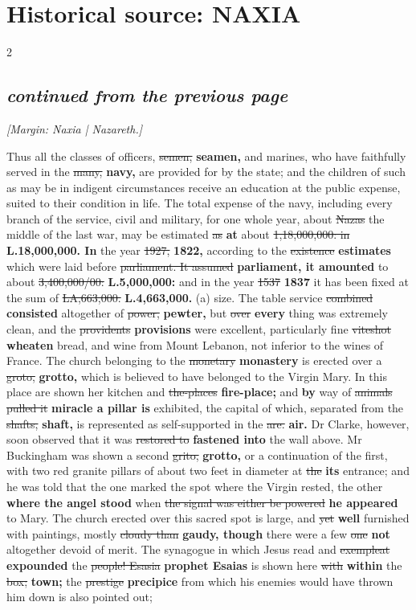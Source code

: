 \documentclass[10pt]{article}
\begin{document}
\section*{Historical source: NAXIA}
\begin{multicols}{2}
\subsection*{\textit{continued from the previous page}}
{\small\itshape [Margin: Naxia | Nazareth.]}\par
Thus all the classes of officers, \sout{semen,} \textbf{seamen,} and marines, who have faithfully served in the \sout{many,} \textbf{navy,} are provided for by the state; and the children of such as may be in indigent circumstances receive an education at the public expense, suited to their condition in life. The total expense of the navy, including every branch of the service, civil and military, for one whole year, about \sout{Nazas} the middle of the last war, may be estimated \sout{as} \textbf{at} about \sout{1,18,000,000: in} \textbf{L.18,000,000. In} the year \sout{1927,} \textbf{1822,} according to the \sout{existence} \textbf{estimates} which were laid before \sout{parliament. It assumed} \textbf{parliament, it amounted} to about \sout{3,400,000/00:} \textbf{L.5,000,000:} and in the year \sout{1537} \textbf{1837} it has been fixed at the sum of \sout{LA,663,000.} \textbf{L.4,663,000.} (a) size. The table service \sout{combined} \textbf{consisted} altogether of \sout{power,} \textbf{pewter,} but \sout{over} \textbf{every} thing was extremely clean, and the \sout{providents} \textbf{provisions} were excellent, particularly fine \sout{viteshot} \textbf{wheaten} bread, and wine from Mount Lebanon, not inferior to the wines of France. The church belonging to the \sout{monetary} \textbf{monastery} is erected over a \sout{groto,} \textbf{grotto,} which is believed to have belonged to the Virgin Mary. In this place are shown her kitchen and \sout{the-places} \textbf{fire-place;} and \textbf{by} way of \sout{animals pulled it} \textbf{miracle a pillar is} exhibited, the capital of which, separated from the \sout{shafts,} \textbf{shaft,} is represented as self-supported in the \sout{are.} \textbf{air.} Dr Clarke, however, soon observed that it was \sout{restored to} \textbf{fastened into} the wall above. Mr Buckingham was shown a second \sout{grito,} \textbf{grotto,} or a continuation of the first, with two red granite pillars of about two feet in diameter at \sout{the} \textbf{its} entrance; and he was told that the one marked the spot where the Virgin rested, the other \textbf{where the angel stood} when \sout{the signal was either be powered} \textbf{he appeared} to Mary. The church erected over this sacred spot is large, and \sout{yet} \textbf{well} furnished with paintings, mostly \sout{cloudy than} \textbf{gaudy, though} there were a few \sout{one} \textbf{not} altogether devoid of merit. The synagogue in which Jesus read and \sout{exempleat} \textbf{expounded} the \sout{people! Esasia} \textbf{prophet Esaias} is shown here \sout{with} \textbf{within} the \sout{box;} \textbf{town;} the \sout{prestige} \textbf{precipice} from which his enemies would have thrown him down is also pointed out; 
\end{multicols}
\end{document}
